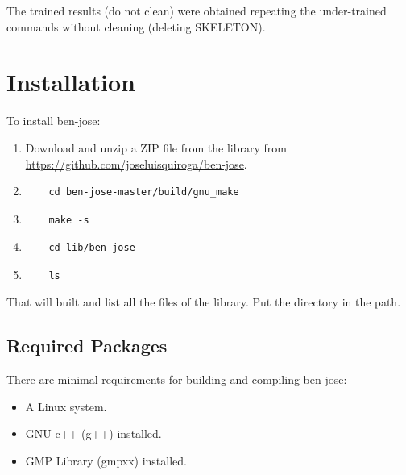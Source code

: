\documentclass{easychair}
\begin{document}
The trained results (do not clean) were obtained repeating the under-trained commands without cleaning (deleting SKELETON).


\section{Installation}
\label{sect:installation}

To install ben-jose:

\begin{enumerate}
\item
Download and unzip a ZIP file from the library from \url{https://github.com/joseluisquiroga/ben-jose}.

\item
\begin{verbatim}
	cd ben-jose-master/build/gnu_make
\end{verbatim}

\item
\begin{verbatim}
	make -s
\end{verbatim}

\item
\begin{verbatim}
	cd lib/ben-jose
\end{verbatim}

\item
\begin{verbatim}
	ls
\end{verbatim}
\end{enumerate}

That will built and list all the files of the library. Put the directory in the path.

\subsection{Required Packages}

There are minimal requirements for building and compiling ben-jose:

\begin{itemize}
\item
A Linux system.

\item
GNU c++ (g++) installed.

\item
GMP Library (gmpxx) installed.
\end{itemize}
\end{document}
